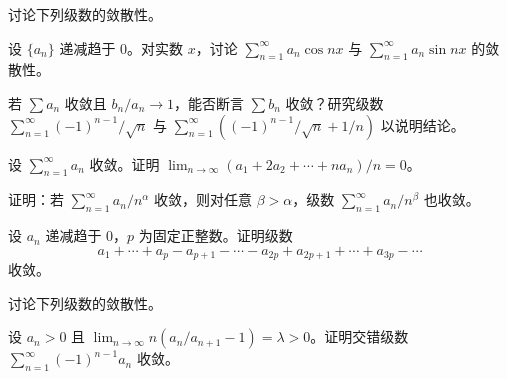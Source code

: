 \newpage
\noindent\begin{minipage}{\textwidth}
讨论下列级数的敛散性。
\end{minipage}\par\vfill
\noindent\begin{minipage}{\textwidth}
设 $\{a_n\}$ 递减趋于 $0$。对实数 $x$，讨论 $\sum_{n=1}^{\infty}a_n\cos nx$ 与 $\sum_{n=1}^{\infty}a_n\sin nx$ 的敛散性。
\end{minipage}\par\vfill
\noindent\begin{minipage}{\textwidth}
若 $\sum a_n$ 收敛且 $b_n/a_n\to1$，能否断言 $\sum b_n$ 收敛？研究级数 $\sum_{n=1}^{\infty}(-1)^{n-1}/\sqrt n$ 与 $\sum_{n=1}^{\infty}((-1)^{n-1}/\sqrt n+1/n)$ 以说明结论。
\end{minipage}\par\vfill
\newpage
\noindent\begin{minipage}{\textwidth}
设 $\sum_{n=1}^{\infty}a_n$ 收敛。证明 $\lim_{n\to\infty}(a_1+2a_2+\cdots+na_n)/n=0$。
\end{minipage}\par\vfill
\noindent\begin{minipage}{\textwidth}
证明：若 $\sum_{n=1}^{\infty}a_n/n^\alpha$ 收敛，则对任意 $\beta>\alpha$，级数 $\sum_{n=1}^{\infty}a_n/n^\beta$ 也收敛。
\end{minipage}\par\vfill
\noindent\begin{minipage}{\textwidth}
设 $a_n$ 递减趋于 $0$，$p$ 为固定正整数。证明级数\[a_1+\cdots+a_p-a_{p+1}-\cdots-a_{2p}+a_{2p+1}+\cdots+a_{3p}-\cdots\]收敛。
\end{minipage}\par\vfill
\newpage
\noindent\begin{minipage}{\textwidth}
讨论下列级数的敛散性。
\end{minipage}\par\vfill
\noindent\begin{minipage}{\textwidth}
设 $a_n>0$ 且 $\lim_{n\to\infty}n(a_n/a_{n+1}-1)=\lambda>0$。证明交错级数 $\sum_{n=1}^{\infty}(-1)^{n-1}a_n$ 收敛。
\end{minipage}\par\vfill
